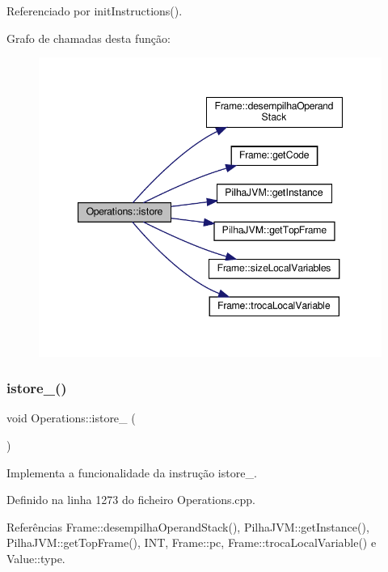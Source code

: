 Referenciado por init\+Instructions().

Grafo de chamadas desta função\+:\nopagebreak
\begin{figure}[H]
\begin{center}
\leavevmode
\includegraphics[width=347pt]{classOperations_a1547cbd0fa84e551f218d472a5187efa_cgraph}
\end{center}
\end{figure}
\mbox{\label{classOperations_ae0a17c510b570467f5b025e3dcbe1398}} 
\subsubsection{\texorpdfstring{istore\+\_()}{istore\_0()}}
{\footnotesize\ttfamily void Operations\+::istore\+\_ (\begin{DoxyParamCaption}{ }\end{DoxyParamCaption})\hspace{0.3cm}{\ttfamily [private]}}



Implementa a funcionalidade da instrução istore\+\_. 



Definido na linha 1273 do ficheiro Operations.\+cpp.



Referências Frame\+::desempilha\+Operand\+Stack(), Pilha\+J\+V\+M\+::get\+Instance(), Pilha\+J\+V\+M\+::get\+Top\+Frame(), I\+NT, Frame\+::pc, Frame\+::troca\+Local\+Variable() e Value\+::type.



